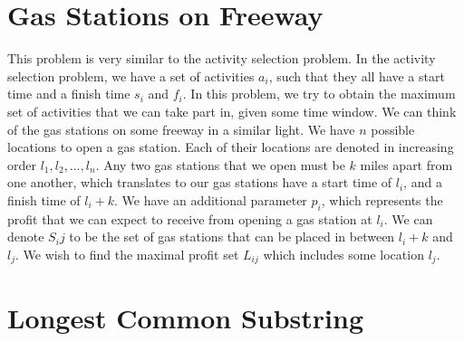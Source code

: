\documentclass{article}
\title{}
\author{JG}
\begin{document}
	\maketitle
	\section{Gas Stations on Freeway}
	This problem is very similar to the activity selection problem. In the activity selection
	problem, we have a set of activities $a_i$, such that they all have a start time and a finish
	time $s_i$ and $f_i$. In this problem, we try to obtain the maximum set of activities that we 
	can take part in, given some time window. We can think of the gas stations on some freeway in 
	a similar light. We have $n$ possible locations to open a gas station. Each of their locations
	are denoted in increasing order $l_1,l_2,\ldots,l_n$. Any two gas stations that we open must be
	$k$ miles apart from one another, which translates to our gas stations have a start time of $l_i$,
	and a finish time of $l_i + k$. We have an additional parameter $p_i$, which represents the profit 
	that we can expect to receive from opening a gas station at $l_i$.
	We can denote $S_ij$ to be the set of gas stations that can be placed in between $l_i + k$ and $l_j$.
	We wish to find the maximal profit set $L_{ij}$ which includes some location $l_j$. 
	\begin{lstlistings}
		
	\end{lstlistings}
	
	\section{Longest Common Substring}
	
	
\end{document}
